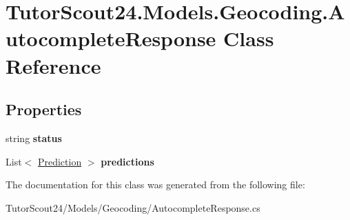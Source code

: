 \hypertarget{class_tutor_scout24_1_1_models_1_1_geocoding_1_1_autocomplete_response}{}\section{Tutor\+Scout24.\+Models.\+Geocoding.\+Autocomplete\+Response Class Reference}
\label{class_tutor_scout24_1_1_models_1_1_geocoding_1_1_autocomplete_response}
\subsection*{Properties}
\begin{DoxyCompactItemize}
\item 
\mbox{\label{class_tutor_scout24_1_1_models_1_1_geocoding_1_1_autocomplete_response_af6ccaefbe9b803a5f91d0dc24d7efe62}} 
string {\bfseries status}
\item 
\mbox{\label{class_tutor_scout24_1_1_models_1_1_geocoding_1_1_autocomplete_response_aa5c0455daf74a3611036af82fa586fe8}} 
List$<$ \mbox{\hyperlink{class_tutor_scout24_1_1_models_1_1_geocoding_1_1_prediction}{Prediction}} $>$ {\bfseries predictions}
\end{DoxyCompactItemize}


The documentation for this class was generated from the following file\+:\begin{DoxyCompactItemize}
\item 
Tutor\+Scout24/\+Models/\+Geocoding/Autocomplete\+Response.\+cs\end{DoxyCompactItemize}
